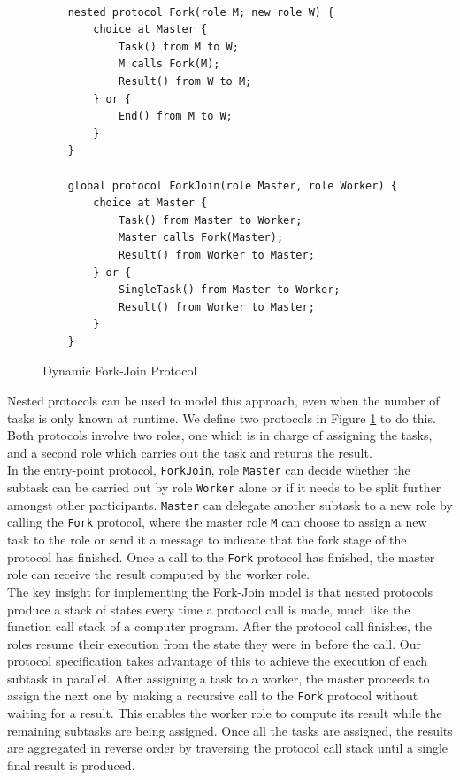 \documentclass[12pt,twoside]{report}
\begin{document}
\begin{figure}[htb!]
    \centering
    \lstset{language=Scribble}
    \begin{lstlisting}
    
    nested protocol Fork(role M; new role W) {
        choice at Master {
            Task() from M to W;
            M calls Fork(M);
            Result() from W to M;
        } or {
            End() from M to W;
        }
    }
    
    global protocol ForkJoin(role Master, role Worker) {
        choice at Master {
            Task() from Master to Worker;
            Master calls Fork(Master);
            Result() from Worker to Master;
        } or {
            SingleTask() from Master to Worker;
            Result() from Worker to Master;
        }
    }
    \end{lstlisting}
    \caption{Dynamic Fork-Join Protocol}
    \label{fork-join-protocol}
\end{figure}{}

Nested protocols can be used to model this approach, even when the number of tasks is only known at runtime. We define two protocols in Figure \ref{fork-join-protocol} to do this. Both protocols involve two roles, one which is in charge of assigning the tasks, and a second role which carries out the task and returns the result.\\

In the entry-point protocol, \texttt{ForkJoin}, role \texttt{Master} can decide whether the subtask can be carried out by role \texttt{Worker} alone or if it needs to be split further amongst other participants. \texttt{Master} can delegate another subtask to a new role by calling the \texttt{Fork} protocol, where the master role \texttt{M} can choose to assign a new task to the role or send it a message to indicate that the fork stage of the protocol has finished. Once a call to the \texttt{Fork} protocol has finished, the master role can receive the result computed by the worker role.\\

The key insight for implementing the Fork-Join model is that nested protocols produce a stack of states every time a protocol call is made, much like the function call stack of a computer program. After the protocol call finishes, the roles resume their execution from the state they were in before the call. Our protocol specification takes advantage of this to achieve the execution of each subtask in parallel. After assigning a task to a worker, the master proceeds to assign the next one by making a recursive call to the \texttt{Fork} protocol without waiting for a result. This enables the worker role to compute its result while the remaining subtasks are being assigned. Once all the tasks are assigned, the results are aggregated in reverse order by traversing the protocol call stack until a single final result is produced.\\
\end{document}
